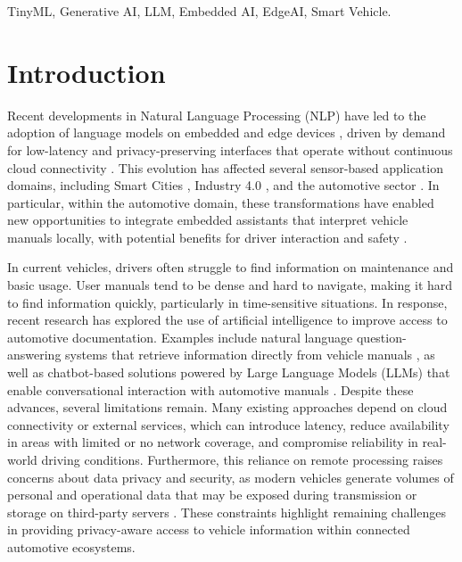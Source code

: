 \documentclass{ieeeaccess}
\begin{document}
\begin{keywords}
TinyML,  Generative AI,  LLM,  Embedded AI, EdgeAI, Smart Vehicle.

\end{keywords}

\titlepgskip=-15pt

\maketitle

 \section{Introduction}

Recent developments in Natural Language Processing (NLP) have led to the adoption of language models on embedded and edge devices \cite{shakhadri2025shakti}, driven by demand for low-latency and privacy-preserving interfaces that operate without continuous cloud connectivity \cite{shakhadri2025shakti}. This evolution has affected several sensor-based application domains, including Smart Cities \cite{theroad}, Industry 4.0 \cite{automotiveSensors}, and the automotive sector \cite{automotiveSensors}. In particular, within the automotive domain, these transformations have enabled new opportunities to integrate embedded assistants that interpret vehicle manuals locally, with potential benefits for driver interaction and safety \cite{electronics13244972}.

In current vehicles, drivers often struggle to find information on maintenance and basic usage. User manuals tend to be dense and hard to navigate, making it hard to find information quickly, particularly in time-sensitive situations. In response, recent research has explored the use of artificial intelligence to improve access to automotive documentation. Examples include natural language question-answering systems that retrieve information directly from vehicle manuals \cite{park2024maqa}, as well as chatbot-based solutions powered by Large Language Models (LLMs) that enable conversational interaction with automotive manuals \cite{lee2023llmchatbot}. Despite these advances, several limitations remain. Many existing approaches depend on cloud connectivity or external services, which can introduce latency, reduce availability in areas with limited or no network coverage, and compromise reliability in real-world driving conditions. Furthermore, this reliance on remote processing raises concerns about data privacy and security, as modern vehicles generate volumes of personal and operational data that may be exposed during transmission or storage on third-party servers \cite{yang2024privacy,he2025securitysurvey}. These constraints highlight remaining challenges in providing privacy-aware access to vehicle information within connected automotive ecosystems.
\end{document}
